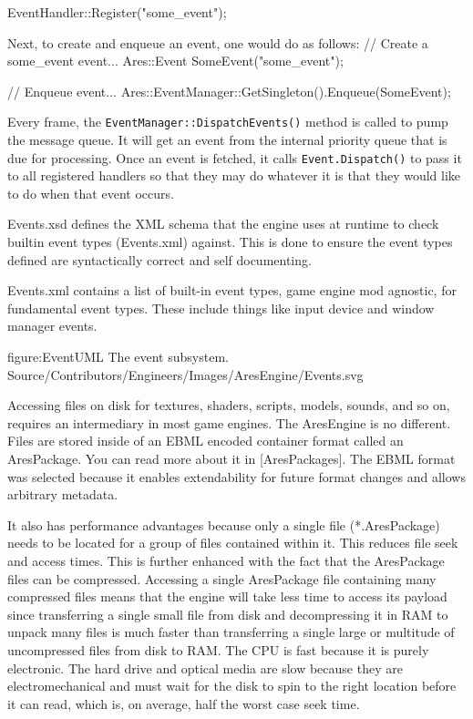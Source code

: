 \startCodeExample
EventHandler::Register("some_event");
\stopCodeExample

Next, to create and enqueue an event, one would do as follows:
\startCodeExample
// Create a some_event event...
Ares::Event SomeEvent("some_event");

// Enqueue event...
Ares::EventManager::GetSingleton().Enqueue(SomeEvent);
\stopCodeExample

Every frame, the {\tt EventManager::DispatchEvents()} method is called to pump the message queue. It will get an event from the internal priority queue that is due for processing. Once an event is fetched, it calls {\tt Event.Dispatch()} to pass it to all registered handlers so that they may do whatever it is that they would like to do when that event occurs.

Events.xsd defines the XML schema that the engine uses at runtime to check builtin event types (Events.xml) against. This is done to ensure the event types defined are syntactically correct and self documenting.

Events.xml contains a list of built-in event types, game engine mod agnostic, for fundamental event types. These include things like input device and window manager events.

\FullPageDiagram
    {figure:EventUML}
    {The event subsystem.}
    {Source/Contributors/Engineers/Images/AresEngine/Events.svg}

\page 
{}
Accessing files on disk for textures, shaders, scripts, models, sounds, and so on, requires an intermediary in most game engines. The AresEngine is no different. Files are stored inside of an EBML encoded container format called an AresPackage. You can read more about it in [AresPackages]. The EBML format was selected because it enables extendability for future format changes and allows arbitrary metadata. 

It also has performance advantages because only a single file (*.AresPackage) needs to be located for a group of files contained within it. This reduces file seek and access times. This is further enhanced with the fact that the AresPackage files can be compressed. Accessing a single AresPackage file containing many compressed files means that the engine will take less time to access its payload since transferring a single small file from disk and decompressing it in RAM to unpack many files is much faster than transferring a single large or multitude of uncompressed files from disk to RAM. The CPU is fast because it is purely electronic. The hard drive and optical media are slow because they are electromechanical and must wait for the disk to spin to the right location before it can read, which is, on average, half the worst case seek time.

